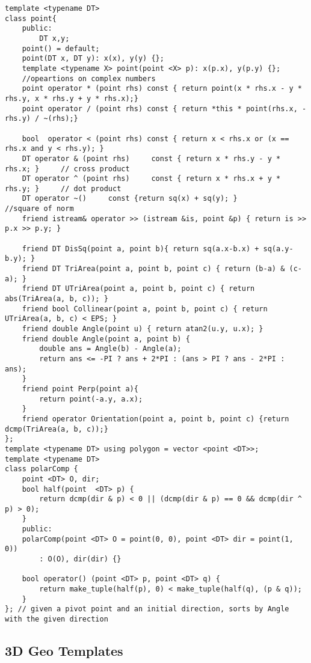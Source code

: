 \documentclass[10pt,a4paper,onesided]{article}
\begin{document}
\begin{multicols*}{3}
\begin{lstlisting}
template <typename DT> 
class point{
    public:
        DT x,y;
    point() = default;
    point(DT x, DT y): x(x), y(y) {};
    template <typename X> point(point <X> p): x(p.x), y(p.y) {};
    //opeartions on complex numbers
    point operator * (point rhs) const { return point(x * rhs.x - y * rhs.y, x * rhs.y + y * rhs.x);}
    point operator / (point rhs) const { return *this * point(rhs.x, - rhs.y) / ~(rhs);}

    bool  operator < (point rhs) const { return x < rhs.x or (x == rhs.x and y < rhs.y); }
    DT operator & (point rhs)     const { return x * rhs.y - y * rhs.x; }     // cross product
    DT operator ^ (point rhs)     const { return x * rhs.x + y * rhs.y; }     // dot product
    DT operator ~()     const {return sq(x) + sq(y); }                        //square of norm
    friend istream& operator >> (istream &is, point &p) { return is >> p.x >> p.y; }
    
    friend DT DisSq(point a, point b){ return sq(a.x-b.x) + sq(a.y-b.y); }
    friend DT TriArea(point a, point b, point c) { return (b-a) & (c-a); }
    friend DT UTriArea(point a, point b, point c) { return abs(TriArea(a, b, c)); }
    friend bool Collinear(point a, point b, point c) { return UTriArea(a, b, c) < EPS; }
    friend double Angle(point u) { return atan2(u.y, u.x); }
    friend double Angle(point a, point b) {
        double ans = Angle(b) - Angle(a);
        return ans <= -PI ? ans + 2*PI : (ans > PI ? ans - 2*PI : ans);
    }
    friend point Perp(point a){
        return point(-a.y, a.x);
    }
    friend operator Orientation(point a, point b, point c) {return dcmp(TriArea(a, b, c));}
};
template <typename DT> using polygon = vector <point <DT>>; 
template <typename DT> 
class polarComp {
    point <DT> O, dir;
    bool half(point  <DT> p) {
        return dcmp(dir & p) < 0 || (dcmp(dir & p) == 0 && dcmp(dir ^ p) > 0);
    }
    public:
    polarComp(point <DT> O = point(0, 0), point <DT> dir = point(1, 0))
        : O(O), dir(dir) {}
  
    bool operator() (point <DT> p, point <DT> q) {
        return make_tuple(half(p), 0) < make_tuple(half(q), (p & q));
    }
}; // given a pivot point and an initial direction, sorts by Angle with the given direction
\end{lstlisting}
\subsection{3D Geo Templates}
\begin{lstlisting}


\end{lstlisting}
\end{multicols*}
\end{document}
